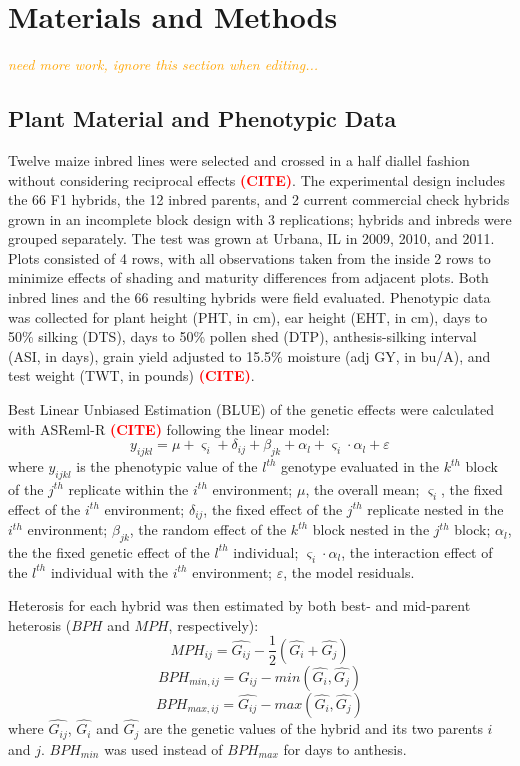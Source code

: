 \documentclass[9pt,twocolumn,twoside]{gsajnl}
\newcommand{\sme}[1]{\textcolor{red}{\bf #1}}
\newcommand{\yang}[1]{\textcolor{orange}{\emph{\scriptsize  #1}} }
\begin{document}
\section*{Materials and Methods} \yang{need more work, ignore this section when editing...}

\subsection*{Plant Material and Phenotypic Data}
Twelve maize inbred lines were selected and crossed in a half diallel fashion without considering reciprocal effects \sme{(CITE)}. The experimental design includes the 66 F1 hybrids, the 12 inbred parents, and 2 current commercial check hybrids grown in an incomplete block design with 3 replications; hybrids and inbreds were grouped separately. The test was grown at Urbana, IL in 2009, 2010, and 2011.  Plots consisted of 4 rows, with all observations taken from the inside 2 rows to minimize effects of shading and maturity differences from adjacent plots. Both inbred lines and the 66 resulting hybrids were field evaluated. Phenotypic data was collected for plant height (PHT, in cm), ear height (EHT, in cm), days to 50\% silking (DTS), days to 50\% pollen shed (DTP), anthesis-silking interval (ASI, in days), grain yield adjusted to 15.5\% moisture (adj GY, in bu/A), and test weight (TWT, in pounds) \sme{(CITE)}.%

Best Linear Unbiased Estimation (BLUE) of the genetic effects were calculated with ASReml-R \sme{(CITE)} following the linear model: 
%
\[y_{ijkl} = \mu + \varsigma_{i} + \delta_{ij} + \beta_{jk} + \alpha_{l} +  \varsigma_{i} \cdot \alpha_{l} + \varepsilon\]
%
where 
$y_{ijkl}$ is the phenotypic value of the $l^{th}$ genotype evaluated in the $k^{th}$ block of the $j^{th}$ replicate within the $i^{th}$ environment; 
$\mu$, the overall mean; 
$\varsigma_{i}$, the fixed effect of the $i^{th}$ environment;
$\delta_{ij}$, the fixed effect of the $j^{th}$ replicate nested in the $i^{th}$ environment; 
$\beta_{jk}$, the random effect of the $k^{th}$ block nested in the $j^{th}$ block; 
$\alpha_{l}$, the the fixed genetic effect  of the $l^{th}$ individual; 
$\varsigma_{i} \cdot \alpha_{l}$, the interaction effect of the $l^{th}$ individual with the $i^{th}$ environment; 
$\varepsilon$, the model residuals.


Heterosis for each hybrid was then estimated by both best- and mid-parent heterosis ($BPH$ and $MPH$, respectively):
%
\[ MPH_{ij}=\hat{G_{ij}}-\frac{1}{2}(\hat{G_{i}}+\hat{G_{j}}) \]
\[ BPH_{min,ij}=\hat{G_{ij}}-min(\hat{G_{i}} ,\hat{G_{j}}) \] 
\[ BPH_{max,ij}=\hat{G_{ij}}-max(\hat{G_{i}} ,\hat{G_{j}}) \]
%
where $\hat{G_{ij}}$, $\hat{G_{i}}$ and $\hat{G_{j}}$ are the genetic values of the hybrid and its two parents $i$ and $j$. $BPH_{min}$ was used instead of $BPH_{max}$ for days to anthesis.\\
\end{document}
